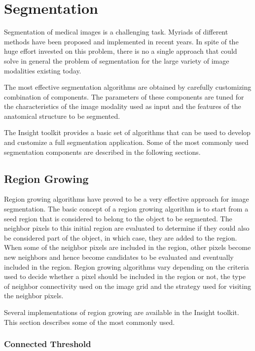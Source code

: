 
\chapter{Segmentation}

Segmentation of medical images is a challenging task. Myriads of different
methods have been proposed and implemented in recent years. In spite of the
huge effort invested on this problem, there is no a single approach that could
solve in general the problem of segmentation for the large variety of image
modalities existing today.

The most effective segmentation algorithms are obtained by carefully
customizing combination of components. The parameters of these components are
tuned for the characteristics of the image modality used as input and the
features of the anatomical structure to be segmented. 

The Insight toolkit provides a basic set of algorithms that can be used to
develop and customize a full segmentation application. Some of the most
commonly used segmentation components are described in the following sections.


\section{Region Growing}

Region growing algorithms have proved to be a very effective approach for image
segmentation. The basic concept of a region growing algorithm is to start from
a seed region that is considered to belong to the object to be segmented. The
neighbor pixels to this initial region are evaluated to determine if they could
also be considered part of the object, in which case, they are added to the
region. When some of the neighbor pixels are included in the region, other
pixels become new neighbors and hence become candidates to be evaluated and
eventually included in the region. Region growing algorithms vary depending on
the criteria used to decide whether a pixel should be included in the region
or not, the type of neighbor connectivity used on the image grid and the
strategy used for visiting the neighbor pixels.

Several implementations of region growing are available in the
Insight toolkit. This section describes some of the most commonly used.

\subsection{Connected Threshold}

